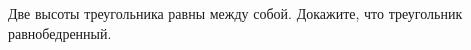 \begin{ex}
	\begin{condition}
		Две высоты треугольника равны между собой. Докажите, что треугольник равнобедренный.
	\end{condition}
\end{ex}